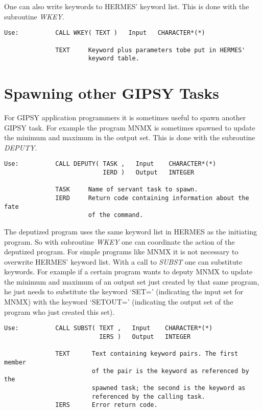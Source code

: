 \noindent One can also write keywords to HERMES' keyword list.  This is
done with the subroutine {\sl WKEY\/}.

\begin{verbatim}
Use:          CALL WKEY( TEXT )   Input   CHARACTER*(*)

              TEXT     Keyword plus parameters tobe put in HERMES'
                       keyword table.
\end{verbatim}

\section{Spawning other GIPSY Tasks}

For GIPSY application programmers it is sometimes useful to spawn
another GIPSY task.  For example the program MNMX is sometimes spawned
to update the minimum and maximum in the output set.  This is done with
the subroutine {\sl DEPUTY\/}.

\begin{verbatim}
Use:          CALL DEPUTY( TASK ,   Input    CHARACTER*(*)
                           IERD )   Output   INTEGER

              TASK     Name of servant task to spawn.
              IERD     Return code containing information about the fate
                       of the command.
\end{verbatim}

\noindent The deputized program uses the same keyword list in HERMES as
the initiating program.  So with subroutine {\sl WKEY\/} one can
coordinate the action of the deputized program.  For simple programs
like MNMX it is not necessary to overwrite HERMES' keyword list.  With a
call to {\sl SUBST\/} one can substitute keywords.  For
example if a certain program wants to deputy MNMX to update the minimum
and maximum of an output set just created by that same program, he just
needs to substitute the keyword `SET=' (indicating the input set for
MNMX) with the keyword `SETOUT=' (indicating the output set of the
program who just created this set).

\begin{verbatim}
Use:          CALL SUBST( TEXT ,   Input    CHARACTER*(*)
                          IERS )   Output   INTEGER

              TEXT      Text containing keyword pairs. The first member
                        of the pair is the keyword as referenced by the
                        spawned task; the second is the keyword as
                        referenced by the calling task.
              IERS      Error return code.
\end{verbatim}

